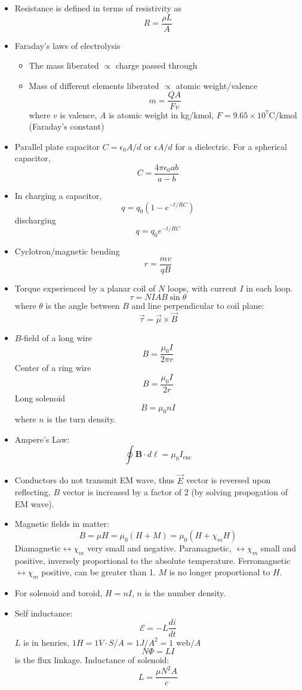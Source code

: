 \begin{itemize}
\item Resistance is defined in terms of resistivity as\[
R=\frac{\rho L}{A}\]

\item Faraday's laws of electrolysis

\begin{itemize}
\item The mass liberated $\propto$ charge passed through
\item Mass of different elements liberated $\propto$ atomic weight/valence\[
m=\frac{QA}{Fv}\]
where $v$ is valence, $A$ is atomic weight in kg/kmol, $F=9.65\times10^{7}$C/kmol
(Faraday's constant)
\end{itemize}
\item Parallel plate capacitor $C=\epsilon_{0}A/d$ or $\epsilon A/d$ for
a dielectric. For a spherical capacitor,\[
C=\frac{4\pi\epsilon_{0}ab}{a-b}\]

\item In charging a capacitor,\[
q=q_{0}(1-e^{-t/RC})\]
discharging\[
q=q_{0}e^{-t/RC}\]

\item Cyclotron/magnetic bending\[
r=\frac{mv}{qB}\]

\item Torque experienced by a planar coil of $N$ loops, with current $I$
in each loop.\[
\tau=NIAB\sin\theta\]
where $\theta$ is the angle between $B$ and line perpendicular to
coil plane:\[
\vec{\tau}=\vec{\mu}\times\vec{B}\]

\item $B$-field of a long wire\[
B=\frac{\mu_{0}I}{2\pi r}\]
Center of a ring wire\[
B=\frac{\mu_{0}I}{2r}\]
Long solenoid\[
B=\mu_{0}nI\]
where $n$ is the turn density.
\item Ampere's Law:\[
\oint\mathbf{B}\cdot d\boldsymbol{\ell}=\mu_{0}I_{\text{enc}}\]

\item Conductors do not transmit EM wave, thus $\vec{E}$ vector is reversed
upon reflecting, $B$ vector is increased by a factor of 2 (by solving
propogation of EM wave).
\item Magnetic fields in matter:\[
B=\mu H=\mu_{0}(H+M)=\mu_{0}(H+\chi_{m}H)\]
Diamagnetic$\leftrightarrow\chi_{m}$ very small and negative. Paramagnetic,
$\leftrightarrow\chi_{m}$ small and positive, inversely proportional
to the absolute temperature. Ferromagnetic $\leftrightarrow\chi_{m}$
positive, can be greater than 1. $M$ is no longer proportional to
$H$.
\item For solenoid and toroid, $H=nI$, $n$ is the number density.
\item Self inductance:\[
\mathcal{E}=-L\frac{di}{dt}\]
$L$ is in henries, $1H=1V\cdot S/A=1J/A^{2}=1\text{ web}/A$\[
N\Phi=LI\]
is the flux linkage. Inductance of solenoid:\[
L=\frac{\mu N^{2}A}{c}\]


\end{itemize}
